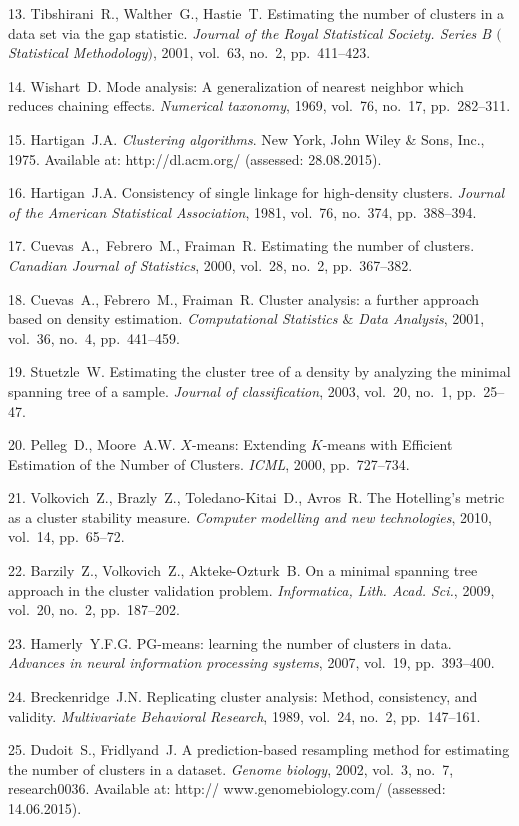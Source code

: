{13. Tibshirani~R., Walther~G., Hastie~T. Estimating the number of
clusters in a data set via the gap statistic. {\it Journal of the
Royal Statistical Society. Series B $($Statistical
Methodology$)$}, 2001, vol.~63, no.~2, pp.~411--423.

14. Wishart~D. Mode analysis: A generalization of nearest neighbor
which reduces chaining effects. {\it Numerical taxonomy}, 1969,
vol.~76, no.~17, pp.~282--311.

15. Hartigan~J.\:A. {\it Clustering algorithms}. New York, John
Wiley \& Sons, Inc., 1975. Available at: http://dl.acm.org/
(assessed: 28.08.2015).

16. Hartigan~J.\:A. Consistency of single linkage for high-density
clusters. {\it Journal of the American Statistical Association},
1981, vol.~76, no.~374, pp.~388--394.

17. Cuevas~A.,~Febrero~M., Fraiman~R. Estimating the number of
clusters. {\it Canadian Journal of Statistics}, 2000, vol.~28,
no.~2, pp.~367--382.

18. Cuevas~A., Febrero~M., Fraiman~R. Cluster analysis: a further
approach based on density estimation. {\it Computational
Statistics $\&$ Data Analysis}, 2001, vol.~36, no.~4,
pp.~441--459.

19. Stuetzle~W. Estimating the cluster tree of a density by
analyzing the minimal spanning tree of a sample. {\it Journal of
classification}, 2003, vol.~20, no.~1, pp.~25--47.

20. Pelleg~D., Moore~A.\:W. $X$-means: Extending $K$-means with
Efficient Estimation of the Number of Clusters. {\it ICML}, 2000,
pp.~727--734.

21. Volkovich~Z., Brazly~Z., Toledano-Kitai~D., Avros~R. The
Hotelling's metric as a cluster stability measure. {\it Computer
modelling and new technologies}, 2010, vol.~14, pp.~65--72.

22. Barzily~Z., Volkovich~Z., Akteke-Ozturk~B. On a minimal
spanning tree approach in the cluster validation problem. {\it
Informatica, Lith. Acad. Sci.}, 2009, vol.~20, no.~2,
pp.~187--202.

23. Hamerly~Y.\:F.\:G. PG-means: learning the number of clusters
in data. {\it Advances in neural information processing systems},
2007, vol.~19, pp.~393--400.

24. Breckenridge~J.\:N. Replicating cluster analysis: Method,
consistency, and validity. {\it Multivariate Behavioral Research},
1989, vol.~24, no.~2, pp.~147--161.

25. Dudoit~S., Fridlyand~J. A prediction-based resampling method
for estimating the number of clusters in a dataset. {\it Genome
biology}, 2002, vol.~3, no.~7, research0036. Available at: http://
www.genomebiology.com/ (assessed: 14.06.2015).

}
